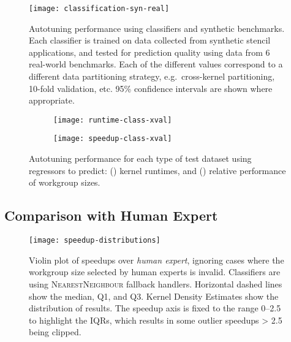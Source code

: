   \begin{figure}
    \centering
    \texttt{[image: classification-syn-real]}
    \vspace{-.7em}
    \caption{%
    Autotuning performance using classifiers and synthetic benchmarks. Each
    classifier is trained on data collected from synthetic stencil
    applications, and tested for prediction quality using data from 6
    real-world benchmarks. Each of the different values correspond to a
    different data partitioning strategy, e.g.\ cross-kernel
    partitioning, 10-fold validation, etc. 95\% confidence intervals are
    shown where appropriate.
    }
    \label{fig:class-syn}
  \end{figure}

  \begin{figure}
    \centering
    \begin{subfigure}[h]{.28\columnwidth}
      \centering
      \texttt{[image: runtime-class-xval]}
      \vspace{-2em}
      \caption{}
      \label{fig:runtime-class-xval}
    \end{subfigure}
    \begin{subfigure}[h]{.28\columnwidth}
      \centering
      \texttt{[image: speedup-class-xval]}
      \vspace{-2em}
      \caption{}
      \label{fig:speedup-class-xval}
    \end{subfigure}
    \vspace{-.5em}
    \caption{%
    Autotuning performance for each type of test dataset using
    regressors to predict: () kernel
    runtimes, and () relative performance
    of workgroup sizes.%
    }
    \label{fig:regression-class}
  \end{figure}


  \subsection{Comparison with Human Expert}

  \begin{figure}
    \centering
    \texttt{[image: speedup-distributions]}
    \vspace{-1.2em}
    \caption{%
    Violin plot of speedups over \emph{human expert}, ignoring cases
    where the workgroup size selected by human experts is
    invalid. Classifiers are using \textsc{NearestNeighbour} fallback
    handlers. Horizontal dashed lines show the median, Q1, and
    Q3. Kernel Density Estimates show the distribution of results. The
    speedup axis is fixed to the range 0--2.5 to highlight the IQRs,
    which results in some outlier speedups > 2.5 being clipped.%
    }
    \label{fig:speedup-distributions}
  \end{figure}

